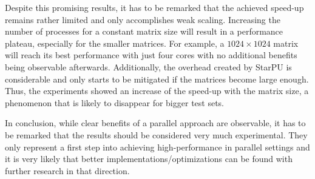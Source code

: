 Despite this promising results, it has to be remarked that the achieved speed-up remains rather limited and only accomplishes weak scaling. Increasing the number of processes for a constant matrix size will result in a performance plateau, especially for the smaller matrices. For example, a $1024 \times 1024$ matrix will reach its best performance with just four cores with no additional benefits being observable afterwards. Additionally, the overhead created by StarPU is considerable and only starts to be mitigated if the matrices become large enough. Thus, the experiments showed an increase of the speed-up with the matrix size, a phenomenon that is likely to disappear for bigger test sets.

In conclusion, while clear benefits of a parallel approach are observable, it has to be remarked that the results should be considered very much experimental. They only represent a first step into achieving high-performance in parallel settings and it is very likely that better implementations/optimizations can be found with further research in that direction. 